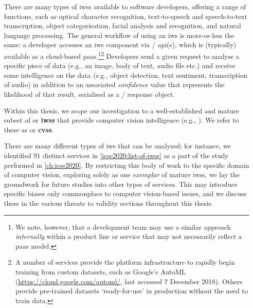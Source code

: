 There are many types of \glspl{iws} available to software developers, offering a range of functions, such as optical character recognition, text-to-speech and speech-to-text transcription, object categorisation, facial analysis and recognition, and natural language processing. The general workflow of using an \gls{iws} is more-or-less the same: a developer accesses an \gls{iws} component via / \gls{api}(s), which is (typically) available as a cloud-based \gls{paas}.\footnote{We note, however, that a development team may use a similar approach \textit{internally} within a product line or service that may not necessarily reflect a \gls{paas} model.}\footnote{A number of services provide the platform infrastructure to rapidly begin training from custom datasets, such as Google's AutoML (\url{https://cloud.google.com/automl/}, last accessed 7 December 2018). Others provide pre-trained datasets `ready-for-use' in production without the need to train data.} Developers send a given request to analyse a specific piece of data (e.g., an image, body of text, audio file etc.) and receive some intelligence on the data (e.g., object detection, text sentiment, transcription of audio) in addition to an associated \textit{confidence} value that represents the likelihood of that result, serialised as a / response object. 


\begin{callout}
Within this thesis, we scope our investigation to a well-established and mature \textup{subset} of \textbf{} or \textbf{\glspl{iws}} that provide computer vision intelligence (e.g., ). We refer to these as \textbf{} or \textbf{\glspl{cvs}}. 
\end{callout}

There are many different types of \gls{iws} that can be analysed; for instance, we identified 91 distinct services in \cref{icse2020:list-of-iwss} as a part of the study performed in \cref{ch:icse2020}. By restricting this body of work to the specific domain of computer vision, exploring solely  as one \textit{exemplar} of mature \glspl{iws}, we lay the groundwork for future studies into other types of services. This may introduce specific biases only commonplace to computer vision-based issues, and we discuss these in the various threats to validity sections throughout this thesis.

